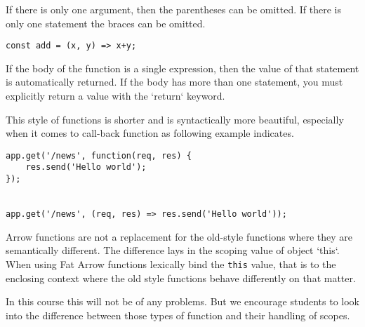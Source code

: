 If there is only one argument, then the parentheses can be omitted. If there is only one statement the braces can be omitted.

\begin{lstlisting}
const add = (x, y) => x+y;
\end{lstlisting}

If the body of the function is a single expression, then the value of that statement is automatically returned. If the body has more than one statement, you must explicitly return a value with the `return` keyword.

This style of functions is shorter and is syntactically more beautiful, especially when it comes to call-back function as following example indicates.

\begin{lstlisting}
app.get('/news', function(req, res) {
    res.send('Hello world');
});


app.get('/news', (req, res) => res.send('Hello world'));    
\end{lstlisting}

Arrow functions are not a replacement for the old-style functions where they are semantically different. The difference lays in the scoping value of object `this`. When using Fat Arrow functions lexically bind the \texttt{this} value, that is to the enclosing context where the old style functions behave differently on that matter.

In this course this will not be of any problems. But we encourage students to look into the difference between those types of function and their handling of scopes.

